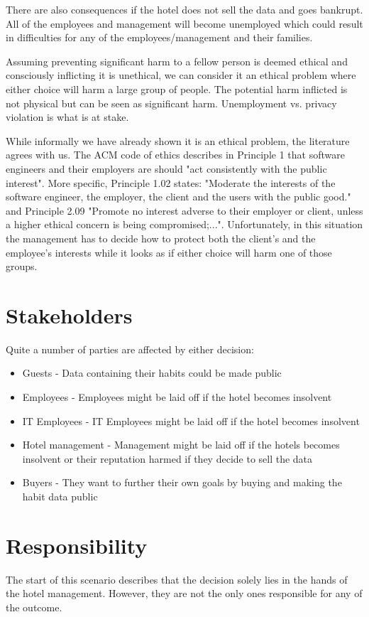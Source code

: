 There are also consequences if the hotel does not sell the data and goes bankrupt. All of the employees and management will become unemployed which could result in difficulties for any of the employees/management and their families. 

Assuming preventing significant harm to a fellow person is deemed ethical and consciously inflicting it is unethical, we can consider it an ethical problem where either choice will harm a large group of people. The potential harm inflicted is not physical but can be seen as significant harm. Unemployment vs. privacy violation is what is at stake.

While informally we have already shown it is an ethical problem, the literature agrees with us. The ACM code of ethics \cite{acm_code_of_conduct} describes in Principle 1 that software engineers and their employers are should "act consistently with the public interest". More specific, Principle 1.02 states: "Moderate the interests of the software engineer, the employer, the client and the users with the public good." and Principle 2.09 "Promote no interest adverse to their employer or client, unless a higher ethical concern is being compromised;...". Unfortunately, in this situation the management has to decide how to protect both the client's and the employee's interests while it looks as if either choice will harm one of those groups.

\section{Stakeholders}
Quite a number of parties are affected by either decision:

\begin{itemize}
	\item Guests - Data containing their habits could be made public
	\item Employees - Employees might be laid off if the hotel becomes insolvent
	\item IT Employees - IT Employees might be laid off if the hotel becomes insolvent
	\item Hotel management - Management might be laid off if the hotels becomes insolvent or their reputation harmed if they decide to sell the data
	\item Buyers - They want to further their own goals by buying and making the habit data public
\end{itemize}


\section{Responsibility}
The start of this scenario describes that the decision solely lies in the hands of the hotel management. However, they are not the only ones responsible for any of the outcome.

